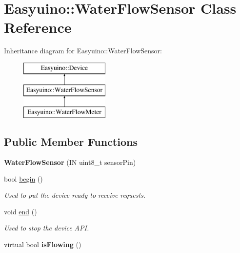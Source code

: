 \hypertarget{class_easyuino_1_1_water_flow_sensor}{}\section{Easyuino\+:\+:Water\+Flow\+Sensor Class Reference}
\label{class_easyuino_1_1_water_flow_sensor}
Inheritance diagram for Easyuino\+:\+:Water\+Flow\+Sensor\+:\begin{figure}[H]
\begin{center}
\leavevmode
\includegraphics[height=3.000000cm]{class_easyuino_1_1_water_flow_sensor}
\end{center}
\end{figure}
\subsection*{Public Member Functions}
\begin{DoxyCompactItemize}
\item 
\mbox{\label{class_easyuino_1_1_water_flow_sensor_acee82d1863cb2311e58210906d9fbfaa}} 
{\bfseries Water\+Flow\+Sensor} (IN uint8\+\_\+t sensor\+Pin)
\item 
bool \hyperlink{class_easyuino_1_1_water_flow_sensor_a55dcab6c527b1e1951a1fff69efdb763}{begin} ()
\begin{DoxyCompactList}\small\item\em Used to put the device ready to receive requests. \end{DoxyCompactList}\item 
void \hyperlink{class_easyuino_1_1_water_flow_sensor_a7f31ac7735b049394d34cfbc37f17359}{end} ()
\begin{DoxyCompactList}\small\item\em Used to stop the device A\+PI. \end{DoxyCompactList}\item 
\mbox{\label{class_easyuino_1_1_water_flow_sensor_a677d164cb17c56407c8102662b0c3cd4}} 
virtual bool {\bfseries is\+Flowing} ()
\end{DoxyCompactItemize}
